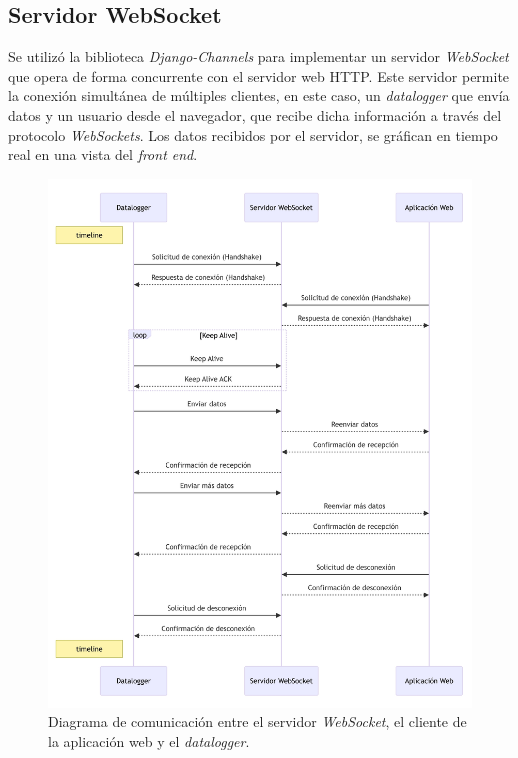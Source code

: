 \subsection{Servidor WebSocket}

Se utilizó la biblioteca \textit{Django-Channels} para implementar un servidor \textit{WebSocket} que opera de forma concurrente con el servidor web HTTP. Este servidor permite la conexión simultánea de múltiples clientes, en este caso, un \textit{datalogger} que envía datos y un usuario desde el navegador, que recibe dicha información a través del protocolo \textit{WebSockets}. Los datos recibidos por el servidor, se gráfican en tiempo real en una vista del \textit{front end}. 

\begin{figure}[H]
    \centering
    \includegraphics[width=1\linewidth]{Figuras/AplicacionWeb/backend/TimeLineWebSocket.jpg}
    \caption{Diagrama de comunicación entre el servidor \textit{WebSocket}, el cliente de la aplicación web y el \textit{datalogger}.}
    \label{fig:TimeLineWebSocket}
\end{figure}

